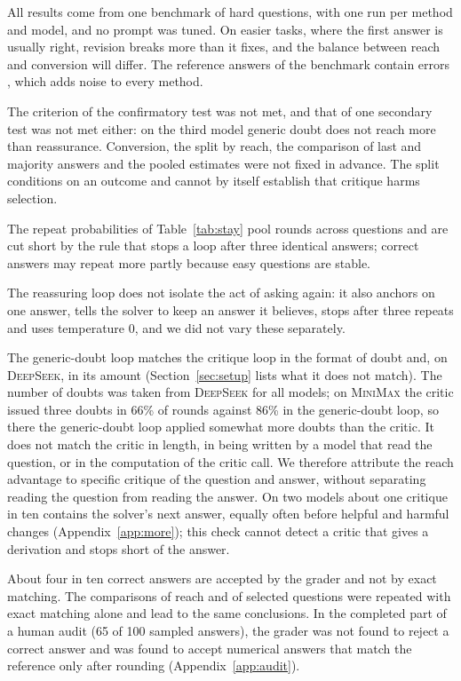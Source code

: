 \documentclass[11pt]{article}
\newcommand{\ds}{\textsc{DeepSeek}}
\newcommand{\mm}{\textsc{MiniMax}}
\begin{document}
All results come from one benchmark of hard questions, with one run per method and model, and no prompt was tuned.
On easier tasks, where the first answer is usually right, revision breaks more than it fixes, and the balance between reach and conversion will differ.
The reference answers of the benchmark contain errors \citep{zhai2026hleverified}, which adds noise to every method.

The criterion of the confirmatory test was not met, and that of one secondary test was not met either: on the third model generic doubt does not reach more than reassurance.
Conversion, the split by reach, the comparison of last and majority answers and the pooled estimates were not fixed in advance.
The split conditions on an outcome and cannot by itself establish that critique harms selection.

The repeat probabilities of Table~\ref{tab:stay} pool rounds across questions and are cut short by the rule that stops a loop after three identical answers; correct answers may repeat more partly because easy questions are stable.

The reassuring loop does not isolate the act of asking again: it also anchors on one answer, tells the solver to keep an answer it believes, stops after three repeats and uses temperature 0, and we did not vary these separately.

The generic-doubt loop matches the critique loop in the format of doubt and, on \ds, in its amount (Section~\ref{sec:setup} lists what it does not match).
The number of doubts was taken from \ds{} for all models; on \mm{} the critic issued three doubts in 66\% of rounds against 86\% in the generic-doubt loop, so there the generic-doubt loop applied somewhat more doubts than the critic.
It does not match the critic in length, in being written by a model that read the question, or in the computation of the critic call.
We therefore attribute the reach advantage to specific critique of the question and answer, without separating reading the question from reading the answer.
On two models about one critique in ten contains the solver's next answer, equally often before helpful and harmful changes (Appendix~\ref{app:more}); this check cannot detect a critic that gives a derivation and stops short of the answer.

About four in ten correct answers are accepted by the grader and not by exact matching.
The comparisons of reach and of selected questions were repeated with exact matching alone and lead to the same conclusions.
In the completed part of a human audit (65 of 100 sampled answers), the grader was not found to reject a correct answer and was found to accept numerical answers that match the reference only after rounding (Appendix~\ref{app:audit}).
\end{document}
